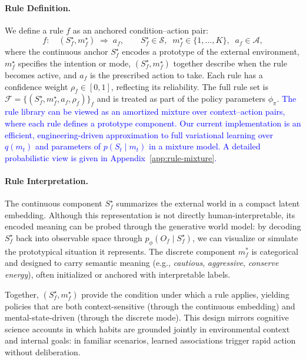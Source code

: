 \documentclass{article} %
\newcommand{\revise}[1]{\textcolor{blue}{#1}}
\begin{document}
\paragraph{Rule Definition.}
We define a rule \(f\) as an anchored condition–action pair:
{\small \[
f:\quad (S_f^\star, m_f^\star)\;\Rightarrow\; a_f,
\qquad S_f^\star \in \mathcal S,\;\; m_f^\star \in \{1,\dots,K\},\;\; a_f \in \mathcal A,
\]}
where the continuous anchor $S_f^\star$ encodes a prototype of the external environment, 
$m_f^\star$ specifies the intention or mode, $(S_f^\star, m_f^\star)$ together describe when the rule becomes active, and \(a_f\) is the prescribed action to take.   
Each rule has a confidence weight \(\rho_f \in [0,1]\), reflecting its reliability. 
The full rule set is
$
\mathcal{F}=\{(S_f^\star, m_f^\star, a_f, \rho_f)\}_f
$
and is treated as part of the policy parameters \(\phi_\pi\). \revise{The rule library can be viewed as an amortized mixture over context--action pairs, where each rule defines a prototype component. Our current implementation is an efficient, engineering-driven approximation to full variational learning over $q(m_t)$ and parameters of $p(S_t \mid m_t)$ in a mixture model. A detailed probabilistic view is given in Appendix~\ref{app:rule-mixture}.}

\paragraph{Rule Interpretation.} The continuous component $S_f^\star$ summarizes the external world in a compact latent embedding. 
Although this representation is not directly human-interpretable, its encoded meaning can be probed 
through the generative world model: by decoding $S_f^\star$ back into observable space through $p_\phi(O_f \mid S_f^\star)$, we can visualize 
or simulate the prototypical situation it represents. The discrete component $m_f^*$ is categorical 
and designed to carry semantic meaning (e.g., \emph{cautious}, \emph{aggressive}, \emph{conserve energy}), 
often initialized or anchored with interpretable labels.  

Together, $(S_f^\star, m_f^\star)$ provide the condition under which a rule applies, yielding policies that 
are both context-sensitive (through the continuous embedding) and mental-state-driven (through the 
discrete mode). This design mirrors cognitive science accounts in which habits are grounded jointly in 
environmental context and internal goals: in familiar scenarios, learned associations trigger rapid action 
without deliberation.  
\end{document}
